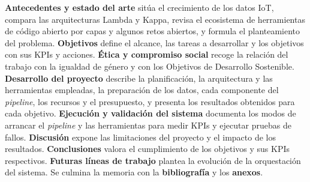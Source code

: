 \textbf{Antecedentes y estado del arte} sitúa el crecimiento de los datos IoT, compara las arquitecturas Lambda y Kappa, revisa el ecosistema de herramientas de código abierto por capas y algunos retos abiertos, y formula el planteamiento del problema. \textbf{Objetivos} define el alcance, las tareas a desarrollar y los objetivos con sus KPIs y acciones. \textbf{Ética y compromiso social} recoge la relación del trabajo con la igualdad de género y con los Objetivos de Desarrollo Sostenible. \textbf{Desarrollo del proyecto} describe la planificación, la arquitectura y las herramientas empleadas, la preparación de los datos, cada componente del \textit{pipeline}, los recursos y el presupuesto, y presenta los resultados obtenidos para cada objetivo. \textbf{Ejecución y validación del sistema} documenta los modos de arrancar el \textit{pipeline} y las herramientas para medir KPIs y ejecutar pruebas de fallos. \textbf{Discusión} expone las limitaciones del proyecto y el impacto de los resultados. \textbf{Conclusiones} valora el cumplimiento de los objetivos y sus KPIs respectivos. \textbf{Futuras líneas de trabajo} plantea la evolución de la orquestación del sistema. Se culmina la memoria con la \textbf{bibliografía} y los \textbf{anexos}.

